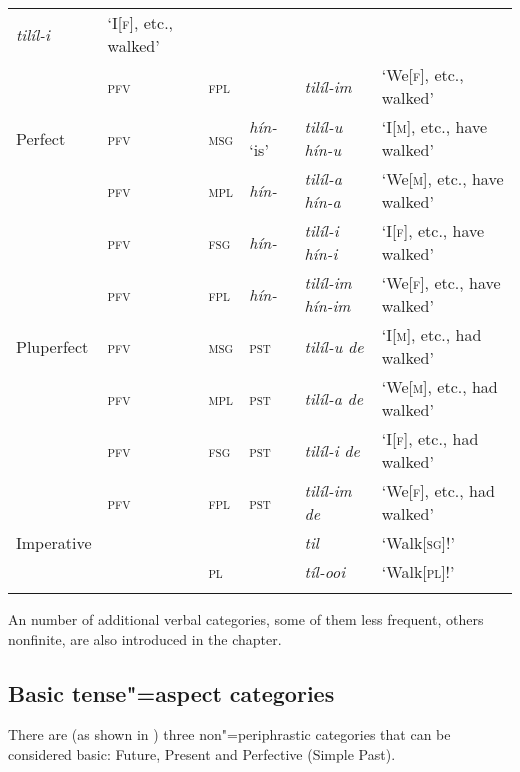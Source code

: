 \begin{table}[ht]
\begin{tabularx}{\textwidth}{ l l l l l l }
\textit{tilíl-i} &
`I[\textsc{f}], etc., walked' \\
&
\textsc{pfv} &
\textsc{fpl} &
&
\textit{tilíl-im} &
`We[\textsc{f}], etc., walked' \\
Perfect &
\textsc{pfv} &
\textsc{msg} &
\textit{hín-} `is' &
\textit{tilíl-u hín-u} &
`I[\textsc{m}], etc., have walked' \\
&
\textsc{pfv} &
\textsc{mpl} &
\textit{hín-} &
\textit{tilíl-a hín-a} &
`We[\textsc{m}], etc., have walked' \\
&
\textsc{pfv} &
\textsc{fsg} &
\textit{hín-} &
\textit{tilíl-i hín-i} &
`I[\textsc{f}], etc., have walked' \\
&
\textsc{pfv} &
\textsc{fpl} &
\textit{hín-} &
\textit{tilíl-im hín-im} &
`We[\textsc{f}], etc., have walked' \\
Pluperfect &
\textsc{pfv} &
\textsc{msg} &
\textsc{pst} &
\textit{tilíl-u de} &
`I[\textsc{m}], etc., had walked' \\
&
\textsc{pfv} &
\textsc{mpl} &
\textsc{pst} &
\textit{tilíl-a de} &
`We[\textsc{m}], etc., had walked' \\
&
\textsc{pfv} &
\textsc{fsg} &
\textsc{pst} &
\textit{tilíl-i de} &
`I[\textsc{f}], etc., had walked' \\
&
\textsc{pfv} &
\textsc{fpl} &
\textsc{pst} &
\textit{tilíl-im de} &
`We[\textsc{f}], etc., had walked' \\
Imperative &
&
&
&
\textit{til} &
`Walk[\textsc{sg}]!' \\
&
&
\textsc{pl} &
&
\textit{tíl-ooi} &
`Walk[\textsc{pl}]!' 
\\\lspbottomrule
\end{tabularx}
\label{tab:9-1b}
\end{table}


An number of additional verbal categories, some of them less frequent, others nonfinite, are also introduced in the chapter.


\subsection{Basic tense"=aspect categories}
\label{subsec:9-1-1}


There are (as shown in ) three non"=periphrastic categories that can be considered basic: Future, Present and Perfective (Simple Past).

